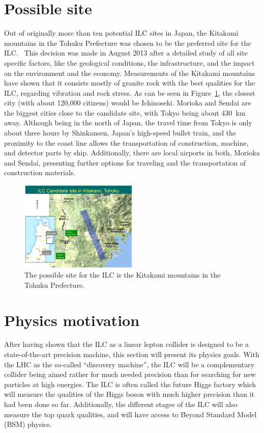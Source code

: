 \section{Possible site}
\label{ILC:site}
Out of originally more than ten potential ILC sites in Japan, the Kitakami mountains in the Tohuku Prefecture was chosen to be the preferred site for the ILC.~\cite{Site}
This decision was made in August 2013 after a detailed study of all site specific factors, like the geological conditions, the infrastructure, and the impact on the environment and the economy.
Measurements of the Kitakami mountains have shown that it consists mostly of granite rock with the best qualities for the ILC, regarding vibration and rock stress.
As can be seen in Figure~\ref{fig:ILC_Site}, the closest city (with about 120,000 citizens) would be Ichinoseki.
Morioka and Sendai are the biggest cities close to the candidate site, with Tokyo being about \SI{430}{\kilo\meter} away.
Although being in the north of Japan, the travel time from Tokyo is only about three hours by Shinkansen, Japan's high-speed bullet train, and the proximity to the coast line allows the transportation of construction, machine, and detector parts by ship.
Additionally, there are local airports in both, Morioka and Sendai, presenting further options for traveling and the transportation of construction materials.
\begin{figure}
\centering
\includegraphics[width=0.5\textwidth]{Figures/ILC-site.jpg}
\caption[Possible site for the ILC]{The possible site for the ILC is the Kitakami mountains in the Tohuku Prefecture.\cite{Kitakami}}
\label{fig:ILC_Site}
\end{figure}

\section{Physics motivation}
\label{ILC:physicsmotivation}
After having shown that the ILC as a linear lepton collider is designed to be a state-of-the-art precision machine, this section will present its physics goals.
With the LHC as the so-called ``discovery machine'', the ILC will be a complementary collider being aimed rather for much needed precision than for searching for new particles at high energies.
The ILC is often called the future Higgs factory which will measure the qualities of the Higgs boson with much higher precision than it had been done so far.
Additionally, the different stages of the ILC will also measure the top quark qualities, and will have access to Beyond Standard Model (BSM) physics.
 
